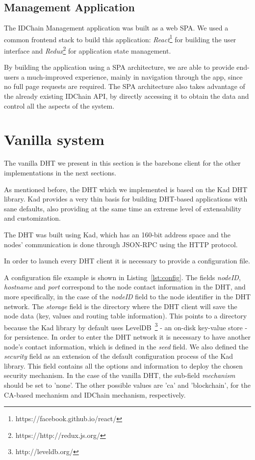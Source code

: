 \subsection{Management Application}
The IDChain Management application was built as a web \ac{SPA}.
We used a common frontend stack to build this application: \textit{React}\footnote{https://facebook.github.io/react/} for building the user interface and \textit{Redux}\footnote{https://http://redux.js.org/} for application state management.

By building the application using a SPA architecture, we are able to provide end-users a much-improved experience, mainly in navigation through the app, since no full page requests are required.
The \ac{SPA} architecture also takes advantage of the already existing IDChain API, by directly accessing it to obtain the data and control all the aspects of the system.

\section{Vanilla system}

The vanilla \ac{DHT} we present in this section is the barebone client for the other implementations in the next sections.

As mentioned before, the \ac{DHT} which we implemented is based on the Kad DHT library.
Kad provides a very thin basis for building DHT-based applications with sane defaults, also providing at the same time an extreme level of extensability and customization.

The DHT was built using Kad, which has an 160-bit address space and the nodes' communication is done through JSON-RPC using the \ac{HTTP} protocol.

In order to launch every DHT client it is necessary to provide a configuration file.

A configuration file example is shown in Listing~\ref{lst:config}.
The fields \textit{nodeID}, \textit{hostname} and \textit{port} correspond to the node contact information in the DHT, and more specifically, in the case of the \textit{nodeID} field to the node identifier in the DHT network.
The \textit{storage} field is the directory where the DHT client will save the node data (key, values and routing table information). This points to a directory because the Kad library by default uses LevelDB~\footnote{http://leveldb.org/} - an on-disk key-value store - for persistence.
In order to enter the DHT network it is necessary to have another node's contact information, which is defined in the \textit{seed} field.
We also defined the \textit{security} field as an extension of the default configuration process of the Kad library.
This field contains all the options and information to deploy the chosen security mechanism.
In the case of the vanilla DHT, the sub-field \textit{mechanism} should be set to 'none'.
The other possible values are 'ca' and 'blockchain', for the CA-based mechanism and IDChain mechanism, respectively.

